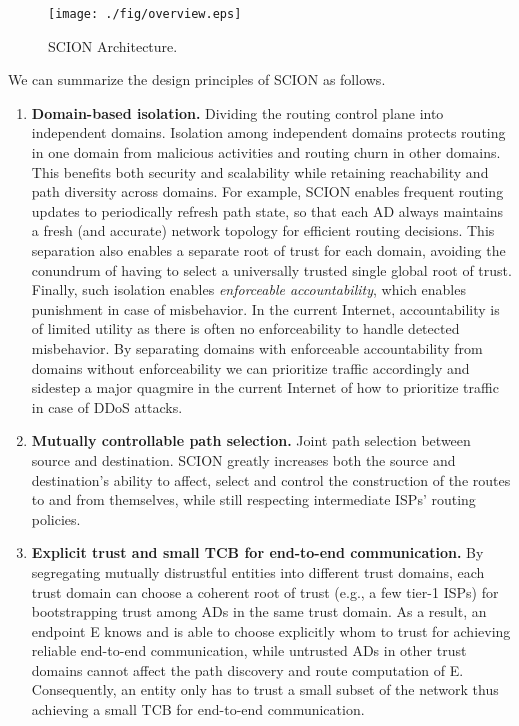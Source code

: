 \begin{figure*}[ht]
\centering
\texttt{[image: ./fig/overview.eps]}
\caption{SCION Architecture.}\label{fig:overview}
\end{figure*}

We can summarize the design principles of SCION as follows.
\begin{enumerate}
\item {\bf Domain-based isolation.}
  Dividing the routing control plane into
  independent domains. Isolation among independent domains protects routing in
  one domain from malicious activities and routing churn in other domains. This
  benefits both security and scalability while retaining reachability and path
  diversity across domains. For example, SCION enables frequent routing updates
  to periodically refresh path state, so that each AD always maintains a fresh
  (and accurate) network topology for efficient routing decisions. This
  separation also enables a separate root of trust for each domain, avoiding the
  conundrum of having to select a universally trusted single global root of
  trust. Finally, such isolation enables \textit{enforceable accountability},
  which enables punishment in case of misbehavior. In the current Internet,
  accountability is of limited utility as there is often no enforceability to
  handle detected misbehavior. By separating domains with enforceable
  accountability from domains without enforceability we can prioritize traffic
  accordingly and sidestep a major quagmire in the current Internet of how to
  prioritize traffic in case of DDoS attacks.
\item {\bf Mutually controllable path selection.} Joint path selection between
  source and destination. SCION greatly increases both the source and
  destination’s ability to affect, select and control the construction of the
  routes to and from themselves, while still respecting intermediate ISPs’
  routing policies.
\item {\bf Explicit trust and small TCB for end-to-end communication.} By
  segregating mutually distrustful entities into different trust domains, each
  trust domain can choose a coherent root of trust (e.g., a few tier-1 ISPs) for
  bootstrapping trust among ADs in the same trust domain. As a result, an
  endpoint E knows and is able to choose explicitly whom to trust for achieving
  reliable end-to-end communication, while untrusted ADs in other trust domains
  cannot affect the path discovery and route computation of E. Consequently, an
  entity only has to trust a small subset of the network thus achieving a small
  TCB for end-to-end communication.
\end{enumerate}


